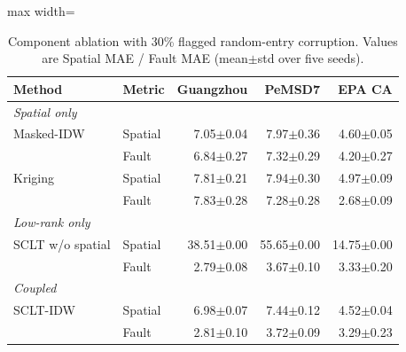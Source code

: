 \begin{table}[htbp]
\centering
\caption{Component ablation with 30\% flagged random-entry corruption. Values are Spatial MAE / Fault MAE (mean$\pm$std over five seeds).}
\label{tab:component_ablation}
\TableFont
\setlength{\tabcolsep}{4pt}
\begin{adjustbox}{max width=\textwidth}
\begin{tabular}{llrrr}
\toprule
\rowcolor{TableHeader}
Method & Metric & Guangzhou & PeMSD7 & EPA CA \\
\midrule
\multicolumn{5}{l}{\textit{Spatial only}} \\
\addlinespace[2pt]
Masked-IDW & Spatial & 7.05$\pm$0.04 & 7.97$\pm$0.36 & 4.60$\pm$0.05 \\
 & Fault & 6.84$\pm$0.27 & 7.32$\pm$0.29 & 4.20$\pm$0.27 \\
Kriging & Spatial & 7.81$\pm$0.21 & 7.94$\pm$0.30 & 4.97$\pm$0.09 \\
 & Fault & 7.83$\pm$0.28 & 7.28$\pm$0.28 & 2.68$\pm$0.09 \\
\midrule
\multicolumn{5}{l}{\textit{Low-rank only}} \\
\addlinespace[2pt]
SCLT w/o spatial & Spatial & 38.51$\pm$0.00 & 55.65$\pm$0.00 & 14.75$\pm$0.00 \\
 & Fault & 2.79$\pm$0.08 & 3.67$\pm$0.10 & 3.33$\pm$0.20 \\
\midrule
\multicolumn{5}{l}{\textit{Coupled}} \\
\addlinespace[2pt]
SCLT-IDW & Spatial & 6.98$\pm$0.07 & 7.44$\pm$0.12 & 4.52$\pm$0.04 \\
 & Fault & 2.81$\pm$0.10 & 3.72$\pm$0.09 & 3.29$\pm$0.23 \\
\bottomrule
\end{tabular}
\end{adjustbox}
\end{table}
